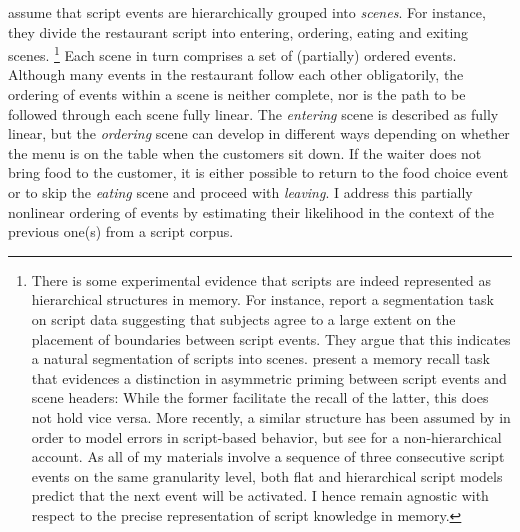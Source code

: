 \citet{schank.abelson1977} assume that script events are hierarchically grouped into \textit{scenes}. For instance, they divide the restaurant script into entering, ordering, eating and exiting scenes.%
%
\footnote{There is some experimental evidence that scripts are indeed represented as hierarchical structures in memory. For instance, \citet{bower.etal1979} report a segmentation task on script data suggesting that subjects agree to a large extent on the placement of boundaries between script events. They argue that this indicates a natural segmentation of scripts into scenes. \citet{abbott.etal1985} present a memory recall task that evidences a distinction in asymmetric priming between script events and scene headers: While the former facilitate the recall of the latter, this does not hold vice versa. More recently, a similar structure has been assumed by \citet{cooper.shallice2000} in order to model errors in script-based behavior, but see \citet{botvinick.plaut2004} for a non-hierarchical account. As all of my materials involve a sequence of three consecutive script events on the same granularity level, both flat and hierarchical script models predict that the next event will be activated. I hence remain agnostic with respect to the precise representation of script knowledge in memory.}\afterfn%
%
Each scene in turn comprises a set of (partially) ordered events. Although many events in the restaurant follow each other obligatorily, the ordering of events within a scene is neither complete, nor is the path to be followed through each scene fully linear. The \textit{entering} scene is described as fully linear, but the \textit{ordering} scene can develop in different ways depending on whether the menu is on the table when the customers sit down. If the waiter does not bring food to the customer, it is either possible to return to the food choice event or to skip the \textit{eating} scene and proceed with \textit{leaving}. I address this partially nonlinear ordering of events by estimating their likelihood in the context of the previous one(s) from a script corpus.

